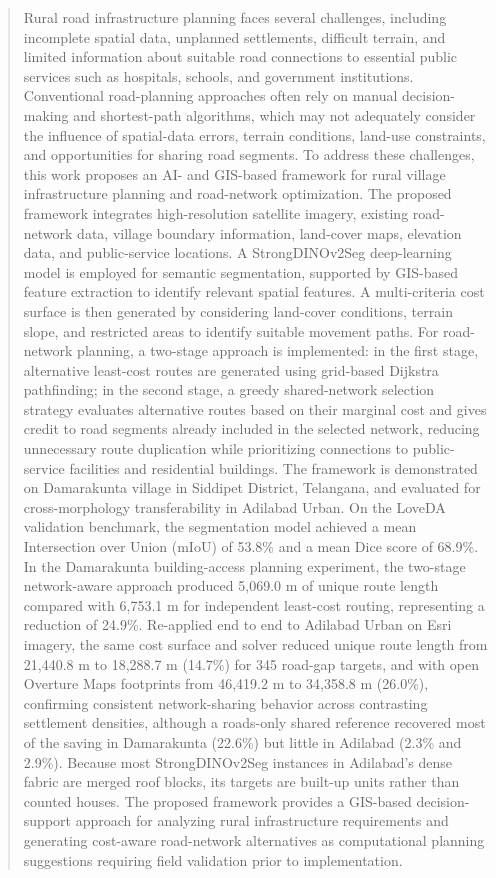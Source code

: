 \documentclass[journal]{IEEEtran}
\begin{document}
\begin{abstract}
Rural road infrastructure planning faces several challenges, including incomplete spatial data, unplanned settlements, difficult terrain, and limited information about suitable road connections to essential public services such as hospitals, schools, and government institutions. Conventional road-planning approaches often rely on manual decision-making and shortest-path algorithms, which may not adequately consider the influence of spatial-data errors, terrain conditions, land-use constraints, and opportunities for sharing road segments. To address these challenges, this work proposes an AI- and GIS-based framework for rural village infrastructure planning and road-network optimization. The proposed framework integrates high-resolution satellite imagery, existing road-network data, village boundary information, land-cover maps, elevation data, and public-service locations. A StrongDINOv2Seg deep-learning model is employed for semantic segmentation, supported by GIS-based feature extraction to identify relevant spatial features. A multi-criteria cost surface is then generated by considering land-cover conditions, terrain slope, and restricted areas to identify suitable movement paths. For road-network planning, a two-stage approach is implemented: in the first stage, alternative least-cost routes are generated using grid-based Dijkstra pathfinding; in the second stage, a greedy shared-network selection strategy evaluates alternative routes based on their marginal cost and gives credit to road segments already included in the selected network, reducing unnecessary route duplication while prioritizing connections to public-service facilities and residential buildings. The framework is demonstrated on Damarakunta village in Siddipet District, Telangana, and evaluated for cross-morphology transferability in Adilabad Urban. On the LoveDA validation benchmark, the segmentation model achieved a mean Intersection over Union (mIoU) of 53.8\% and a mean Dice score of 68.9\%. In the Damarakunta building-access planning experiment, the two-stage network-aware approach produced 5,069.0 m of unique route length compared with 6,753.1 m for independent least-cost routing, representing a reduction of 24.9\%. Re-applied end to end to Adilabad Urban on Esri imagery, the same cost surface and solver reduced unique route length from 21,440.8 m to 18,288.7 m (14.7\%) for 345 road-gap targets, and with open Overture Maps footprints from 46,419.2 m to 34,358.8 m (26.0\%), confirming consistent network-sharing behavior across contrasting settlement densities, although a roads-only shared reference recovered most of the saving in Damarakunta (22.6\%) but little in Adilabad (2.3\% and 2.9\%). Because most StrongDINOv2Seg instances in Adilabad's dense fabric are merged roof blocks, its targets are built-up units rather than counted houses. The proposed framework provides a GIS-based decision-support approach for analyzing rural infrastructure requirements and generating cost-aware road-network alternatives as computational planning suggestions requiring field validation prior to implementation.
\end{abstract}
\end{document}
